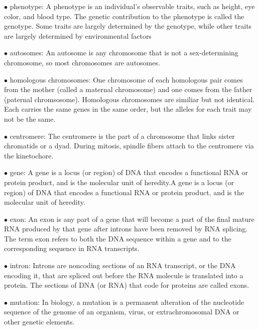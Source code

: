 \documentclass{article}
\begin{document}
\vspace{0.1in}
$\bullet$ phenotype:
A phenotype is an individual's observable traits, such as height, eye color, and blood type. The genetic contribution to the phenotype is called the genotype. Some traits are largely determined by the genotype, while other traits are largely determined by environmental factors


\vspace{0.1in}
$\bullet$ autosomes:
An autosome is any chromosome that is not a sex-determining chromosome, so most chromosomes are autosomes.


\vspace{0.1in}
$\bullet$ homologous chromosomes:
One chromosome of each homologous pair comes from the mother (called a maternal chromosome) and one comes from the father (paternal chromsosome). Homologous chromosomes are similiar but not identical. Each carries the same genes in the same order, but the alleles for each trait may not be the same.


\vspace{0.1in}
$\bullet$ centromere:
The centromere is the part of a chromosome that links sister chromatids or a dyad. During mitosis, spindle fibers attach to the centromere via the kinetochore. 


\vspace{0.1in}
$\bullet$ gene:
A gene is a locus (or region) of DNA that encodes a functional RNA or protein product, and is the molecular unit of heredity.A gene is a locus (or region) of DNA that encodes a functional RNA or protein product, and is the molecular unit of heredity.


\vspace{0.1in}
$\bullet$ exon:
An exon is any part of a gene that will become a part of the final mature RNA produced by that gene after introns have been removed by RNA splicing. The term exon refers to both the DNA sequence within a gene and to the corresponding sequence in RNA transcripts.


\vspace{0.1in}
$\bullet$ intron:
Introns are noncoding sections of an RNA transcript, or the DNA encoding it, that are spliced out before the RNA molecule is translated into a protein. The sections of DNA (or RNA) that code for proteins are called exons.


\vspace{0.1in}
$\bullet$ mutation:
In biology, a mutation is a permanent alteration of the nucleotide sequence of the genome of an organism, virus, or extrachromosomal DNA or other genetic elements.
\end{document}
